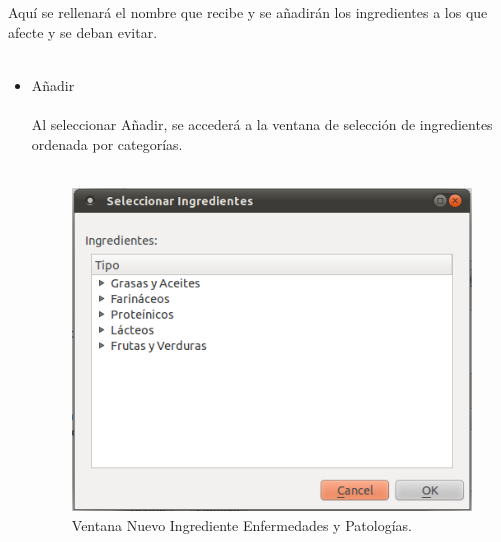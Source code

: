 \begin{enumerate}
\begin{enumerate}
\begin{enumerate}
\begin{enumerate}
Aquí se rellenará el nombre que recibe y se añadirán los ingredientes a los que afecte y se deban evitar.\\\\
\begin{itemize}
\item Añadir\\\\
Al seleccionar Añadir, se accederá a la ventana de selección de ingredientes ordenada por categorías.\\\\
\begin{figure}[H]
  \label{nuevo_ingred_enfermedad}
  \begin{center}
    \includegraphics[scale=0.5]{../../Image/enfermedad-nuevoingrd.png}
  \end{center}
  \caption{Ventana Nuevo Ingrediente Enfermedades y Patologías.}
\end{figure}


\end{itemize}
\end{enumerate}
\end{enumerate}
\end{enumerate}
\end{enumerate}
